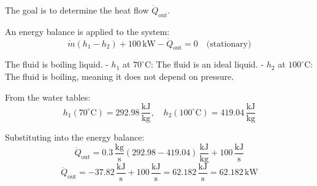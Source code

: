 The goal is to determine the heat flow \( \dot{Q}_{\text{out}} \).  

An energy balance is applied to the system:  
\[
\dot{m} (h_1 - h_2) + 100 \, \text{kW} - \dot{Q}_{\text{out}} = 0 \quad \text{(stationary)}
\]  

The fluid is boiling liquid.  
- \( h_1 \) at \( 70^\circ\text{C} \): The fluid is an ideal liquid.  
- \( h_2 \) at \( 100^\circ\text{C} \): The fluid is boiling, meaning it does not depend on pressure.  

From the water tables:  
\[
h_1(70^\circ\text{C}) = 292.98 \, \frac{\text{kJ}}{\text{kg}}, \quad h_2(100^\circ\text{C}) = 419.04 \, \frac{\text{kJ}}{\text{kg}}
\]  

Substituting into the energy balance:  
\[
\dot{Q}_{\text{out}} = 0.3 \, \frac{\text{kg}}{\text{s}} \left(292.98 - 419.04\right) \, \frac{\text{kJ}}{\text{kg}} + 100 \, \frac{\text{kJ}}{\text{s}}
\]  
\[
\dot{Q}_{\text{out}} = -37.82 \, \frac{\text{kJ}}{\text{s}} + 100 \, \frac{\text{kJ}}{\text{s}} = 62.182 \, \frac{\text{kJ}}{\text{s}} = 62.182 \, \text{kW}
\]